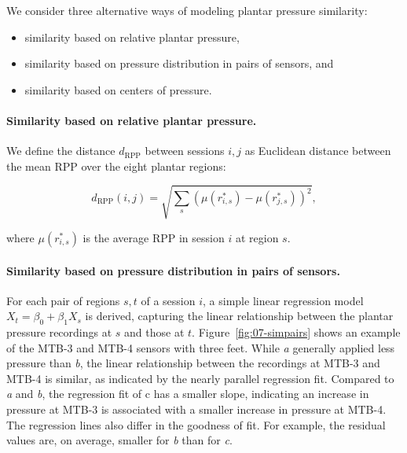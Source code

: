 \documentclass[
  oneside]{book}
\providecommand{\tightlist}{%
  \setlength{\itemsep}{0pt}\setlength{\parskip}{0pt}}
\begin{document}
We consider three alternative ways of modeling plantar pressure similarity:

\begin{itemize}
\tightlist
\item
  similarity based on relative plantar pressure,
\item
  similarity based on pressure distribution in pairs of sensors, and
\item
  similarity based on centers of pressure.
\end{itemize}

\paragraph*{Similarity based on relative plantar pressure.}

We define the distance \(d_{\text{RPP}}\) between sessions \(i,j\) as Euclidean distance between the mean RPP over the eight plantar regions:

\begin{equation}
d_{\text{RPP}}(i,j) = \sqrt{\sum_{s} \left( \mu(r^*_{i,s}) - \mu(r^*_{j,s}) \right)^2},
\label{eq:simrpp}
\end{equation}

where \(\mu(r^*_{i,s})\) is the average RPP in session \(i\) at region \(s\).

\paragraph*{Similarity based on pressure distribution in pairs of sensors.}

For each pair of regions \(s,t\) of a session \(i\), a simple linear regression model \(X_t = \beta_0+\beta_1X_s\) is derived, capturing the linear relationship between the plantar pressure recordings at \(s\) and those at \(t\).
Figure~\ref{fig:07-simpairs} shows an example of the MTB-3 and MTB-4 sensors with three feet.
While \emph{a} generally applied less pressure than \emph{b}, the linear relationship between the recordings at MTB-3 and MTB-4 is similar, as indicated by the nearly parallel regression fit.
Compared to \emph{a} and \emph{b}, the regression fit of c has a smaller slope, indicating an increase in pressure at MTB-3 is associated with a smaller increase in pressure at MTB-4.
The regression lines also differ in the goodness of fit.
For example, the residual values are, on average, smaller for \emph{b} than for \emph{c}.
\end{document}
